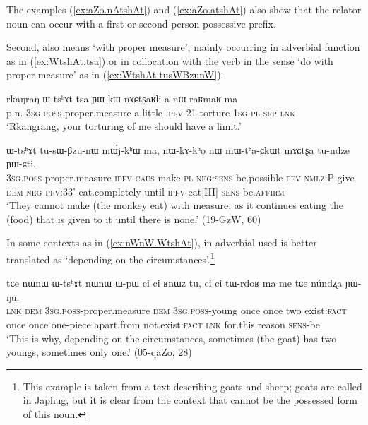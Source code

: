 The examples (\ref{ex:aZo.nAtshAt}) and (\ref{ex:aZo.atshAt}) also show that the relator noun  can occur with a first or second person possessive prefix.

Second,  also means `with proper measure', mainly occurring in adverbial function as in (\ref{ex:WtshAt.tsa}) or in collocation with the verb  in the sense `do with proper measure' as in (\ref{ex:WtshAt.tusWBzunW}). 

\begin{exe}
\ex \label{ex:WtshAt.tsa}
\gll rkaŋraŋ ɯ-tsʰɤt tsa ɲɯ-kɯ-nɤɕtʂaʁli-a-nɯ raʁmaʁ ma  \\
p.n. \textsc{3sg}.\textsc{poss}-proper.measure a.little \textsc{ipfv}-2\fl{}1-torture-\textsc{1sg}-\textsc{pl} \textsc{sfp} \textsc{lnk}  \\
\glt `Rkangrang, your torturing of me should have a limit.' 
\end{exe}

\begin{exe}
\ex \label{ex:WtshAt.tusWBzunW}
\gll ɯ-tsʰɤt tu-sɯ-βzu-nɯ mɯ́j-kʰɯ ma, nɯ-kɤ-kʰo nɯ mɯ-tʰa-ɕkɯt mɤɕtʂa tu-ndze ɲɯ-ɕti. \\
\textsc{3sg}.\textsc{poss}-proper.measure \textsc{ipfv}-\textsc{caus}-make-\textsc{pl} \textsc{neg}:\textsc{sens}-be.possible \textsc{pfv}-\textsc{nmlz}:P-give \textsc{dem} \textsc{neg}-\textsc{pfv}:3\fl{}3'-eat.completely until \textsc{ipfv}-eat[III] \textsc{sens}-be.\textsc{affirm} \\
\glt `They cannot make (the monkey eat) with measure, as it continues eating the (food) that is given to it until there is none.' (19-GzW, 60)
\end{exe}

In some contexts as in (\ref{ex:nWnW.WtshAt}),  in adverbial used is better translated as `depending on the circumstances'.\footnote{This example is taken from a text describing goats and sheep; goats are called  in Japhug, but it is clear from the context that  cannot be the possessed form of this noun. }

\begin{exe}
\ex \label{ex:nWnW.WtshAt}
\gll tɕe nɯnɯ ɯ-tsʰɤt nɯnɯ ɯ-pɯ ci ci ʁnɯz tu, ci ci tɯ-rdoʁ ma me tɕe núndʐa ɲɯ-ŋu. \\
\textsc{lnk} \textsc{dem} \textsc{3sg}.\textsc{poss}-proper.measure \textsc{dem}  \textsc{3sg}.\textsc{poss}-young once once two exist:\textsc{fact} once once one-piece apart.from not.exist:\textsc{fact} \textsc{lnk} for.this.reason \textsc{sens}-be \\
\glt `This is why, depending on the circumstances, sometimes (the goat) has two youngs, sometimes only one.' (05-qaZo, 28)
\end{exe}

